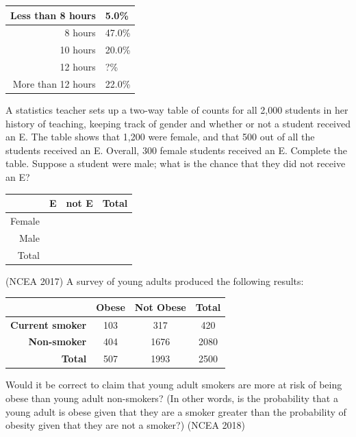 \begin{questions}
            \begin{tabular}{|r|l|}\hline
              Less than 8 hours & 5.0\%\\\hline
              8 hours & 47.0\%\\\hline
              10 hours & 20.0\%\\\hline
              12 hours & ?\%\\\hline
              More than 12 hours & 22.0\%\\\hline
            \end{tabular}
  \question A statistics teacher sets up a two-way table of counts for all 2,000 students in her history
            of teaching, keeping track of gender and whether or not a student received an E. The table shows
            that 1,200 were female, and that 500 out of all the students received an E. Overall, 300 female
            students received an E. Complete the table. Suppose a student were male; what is the chance that
            they did not receive an E?

            \begin{tabular}{|r|c|c|c|}\hline
              & E & not E & Total\\\hline
              Female&\hspace*{10em}&\hspace*{10em}&\hspace*{10em}\\\hline
              Male&&&\\\hline
              Total&&&\\\hline
            \end{tabular}
  \question (NCEA 2017) A survey of young adults produced the following results:

            \begin{tabular}{|r|c|c|c|}\hline
              & \textbf{Obese} & \textbf{Not Obese} & \textbf{Total}\\\hline
              \textbf{Current smoker} &103&317&420\\\hline
              \textbf{Non-smoker} &404&1676&2080\\\hline
              \textbf{Total} &507&1993&2500\\\hline
            \end{tabular}

            Would it be correct to claim that young adult smokers are more at risk of being obese than young adult
            non-smokers? (In other words, is the probability that a young adult is obese given that they are a smoker
            greater than the probability of obesity given that they are not a smoker?)
  \question (NCEA 2018)
    \begin{parts}

\end{parts}
\end{questions}
